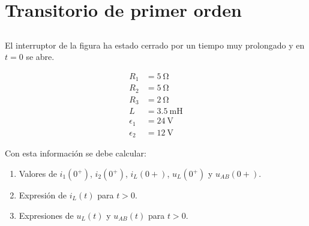 \documentclass[12pt]{article}
\begin{document}
\clearpage

\section{Transitorio de primer orden}

\subsection{}

El interruptor de la figura ha estado cerrado por un tiempo muy
prolongado y en $t = 0$ se abre.

\begin{minipage}{0.5\linewidth}
\end{minipage}
\begin{minipage}{0.5\linewidth}
  \begin{align*}
    R_1 &= \SI{5}{\ohm}\\
    R_2 &= \SI{5}{\ohm}\\
    R_3 &= \SI{2}{\ohm}\\
    L &= \SI{3.5}{\milli\henry}\\
    \epsilon_1 &= \SI{24}{\volt}\\
    \epsilon_2 &= \SI{12}{\volt}
  \end{align*}
\end{minipage}

\medskip

Con esta información se debe calcular:
\begin{enumerate}
\item Valores de $i_1(0^+)$, $i_2(0^+)$, $i_L(0+)$, $u_L(0^+)$ y
  $u_{AB}(0+)$.
\item Expresión de $i_L(t)$ para $t > 0$.
\item Expresiones de $u_L(t)$ y $u_{AB}(t)$ para $t > 0$.
\end{enumerate}
\end{document}
